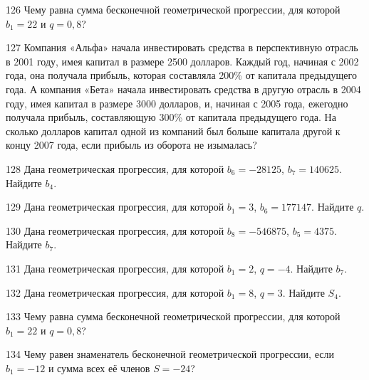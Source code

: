 \documentclass[4apaper]{article}
\begin{document}
\begin{taskBN}{126}
Чему равна сумма бесконечной геометрической прогрессии, для которой $b_1 = 22$ и $q=0,8$?
\end{taskBN}

\begin{taskBN}{127}
Компания «Альфа» начала инвестировать средства в перспективную отрасль в 2001 году, имея капитал в размере 2500 долларов. Каждый год, начиная с 2002 года, она получала прибыль, которая составляла 200\% от капитала предыдущего года. А компания «Бета» начала инвестировать средства в другую отрасль в 2004 году, имея капитал в размере 3000 долларов, и, начиная с 2005 года, ежегодно получала прибыль, составляющую 300\% от капитала предыдущего года. На сколько долларов капитал одной из компаний был больше капитала другой к концу 2007 года, если прибыль из оборота не изымалась?
\end{taskBN}

\begin{taskBN}{128}
Дана геометрическая прогрессия, для которой $b_{6} = -28125$, $b_{7}=140625$. Найдите $b_{4}$.
\end{taskBN}

\begin{taskBN}{129}
Дана геометрическая прогрессия, для которой $b_1 = 3$, $b_{6}=177147$. Найдите $q$.
\end{taskBN}

\begin{taskBN}{130}
Дана геометрическая прогрессия, для которой $b_{8} = -546875$, $b_{5}=4375$. Найдите $b_{7}$.
\end{taskBN}

\begin{taskBN}{131}
Дана геометрическая прогрессия, для которой $b_1 = 2$, $q=-4$. Найдите $b_{7}$.
\end{taskBN}

\begin{taskBN}{132}
Дана геометрическая прогрессия, для которой $b_1 = 8$, $q=3$. Найдите $S_{4}$.
\end{taskBN}

\begin{taskBN}{133}
Чему равна сумма бесконечной геометрической прогрессии, для которой $b_1 = 22$ и $q=0,8$?
\end{taskBN}

\begin{taskBN}{134}
Чему равен знаменатель бесконечной геометрической прогрессии, если $b_1 = -12$ и сумма всех её членов $S=-24$?
\end{taskBN}
\end{document}
